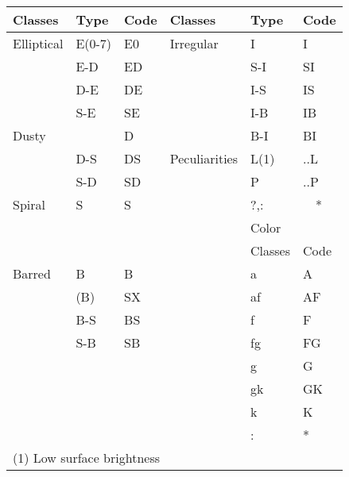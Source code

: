 \begin{center}
\begin{tabular}{l|l|l|l|l|l}
\hline
Classes    & Type   & Code & Classes       & Type & Code  \\
\hline
Elliptical & E(0-7) & E0   & Irregular     & I    & I     \\
           & E-D    & ED   &               & S-I  & SI    \\
           & D-E    & DE   &               & I-S  & IS    \\
           & S-E    & SE   &               & I-B  & IB    \\
\cline{1-3}
Dusty      &        & D    &               & B-I  & BI    \\
                             \cline{4-6}
           & D-S    & DS   & Peculiarities & L(1) & ..L   \\
           & S-D    & SD   &               & P    & ..P   \\
\cline{1-3}
Spiral     & S      & S    &               & ?,:  & ~~*   \\
                             \cline{4-6}
           &        &      &               & Color   &      \\
           &        &      &               & Classes & Code \\
                                             \cline{5-6}
Barred     & B      & B    &               & a       & A    \\
           & (B)    & SX   &               & af      & AF   \\
           & B-S    & BS   &               & f       & F    \\
           & S-B    & SB   &               & fg      & FG   \\
           &        &      &               & g       & G    \\
           &        &      &               & gk      & GK   \\
           &        &      &               & k       & K    \\
           &        &      &               & :       & *    \\
\hline
\multicolumn{6}{l}{(1) Low surface brightness} \\
\end{tabular}
\end{center}
\label{t:yerkes}

